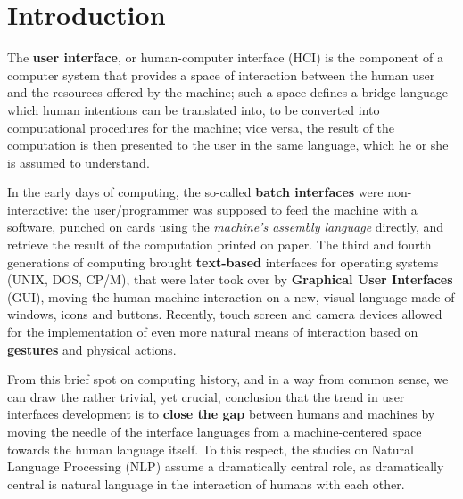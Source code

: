 
\chapter*{Introduction} %

\label{ch:Introduction} %




The \textbf{user interface}, or human-computer interface (HCI) is the component of a computer system that provides a space of interaction between the human user and the resources offered by the machine; such a space defines a bridge language which human intentions can be translated into, to be converted into computational procedures for the machine; vice versa, the result of the computation is then presented to the user in the same language, which he or she is assumed to understand.

In the early days of computing, the so-called \textbf{batch interfaces} were non-interactive: the user/programmer was supposed to feed the machine with a software, punched on cards using the \textit{machine's assembly language} directly, and retrieve the result of the computation printed on paper. The third and fourth generations of computing brought \textbf{text-based} interfaces for operating systems (UNIX, DOS, CP/M), that were later took over by \textbf{Graphical User Interfaces} (GUI), moving the human-machine interaction on a new, visual language made of windows, icons and buttons. Recently, touch screen and camera devices allowed for the implementation of even more natural means of interaction based on \textbf{gestures} and physical actions.

From this brief spot on computing history, and in a way from common sense, we can draw the rather trivial, yet crucial, conclusion that the trend in user interfaces development is to \textbf{close the gap} between humans and machines by moving the needle of the interface languages from a machine-centered space towards the human language itself. To this respect, the studies on Natural Language Processing (NLP) assume a dramatically central role, as dramatically central is natural language in the interaction of humans with each other.

